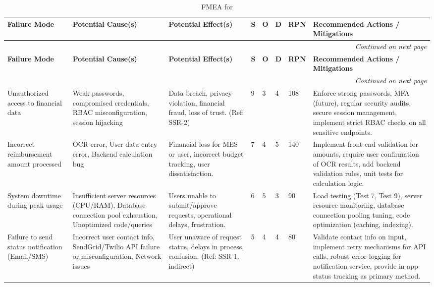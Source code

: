 \documentclass{article}
\begin{document}
\begin{longtable}{|p{2.2cm}|p{2.2cm}|p{3cm}|p{0.6cm}|p{0.6cm}|p{0.6cm}|p{0.6cm}|p{3.5cm}|}
\caption{FMEA for \progname{}} \label{tab:fmea} \\
\hline
\textbf{Failure Mode} & \textbf{Potential Cause(s)} & \textbf{Potential Effect(s)} & \textbf{S} & \textbf{O} & \textbf{D} & \textbf{RPN} & \textbf{Recommended Actions / Mitigations} \\
\hline
\endfirsthead

\multicolumn{8}{|r|}{\textit{Continued on next page}} \\
\hline
\textbf{Failure Mode} & \textbf{Potential Cause(s)} & \textbf{Potential Effect(s)} & \textbf{S} & \textbf{O} & \textbf{D} & \textbf{RPN} & \textbf{Recommended Actions / Mitigations} \\
\hline
\endhead

\multicolumn{8}{|r|}{\textit{Continued on next page}} \\
\hline
\endfoot

\hline
\endlastfoot

Unauthorized access to financial data & Weak passwords, compromised credentials, RBAC misconfiguration, session hijacking & Data breach, privacy violation, financial fraud, loss of trust. (Ref: SSR-2) & 9 & 3 & 4 & 108 & Enforce strong passwords, MFA (future), regular security audits, secure session management, implement strict RBAC checks on all sensitive endpoints. \\
\hline

Incorrect reimbursement amount processed & OCR error, User data entry error, Backend calculation bug & Financial loss for MES or user, incorrect budget tracking, user dissatisfaction. & 7 & 4 & 5 & 140 & Implement front-end validation for amounts, require user confirmation of OCR results, add backend validation rules, unit tests for calculation logic. \\
\hline

System downtime during peak usage & Insufficient server resources (CPU/RAM), Database connection pool exhaustion, Unoptimized code/queries & Users unable to submit/approve requests, operational delays, frustration. & 6 & 5 & 3 & 90 & Load testing (Test 7, Test 9), server resource monitoring, database connection pooling tuning, code optimization (caching, indexing). \\
\hline

Failure to send status notification (Email/SMS) & Incorrect user contact info, SendGrid/Twilio API failure or misconfiguration, Network issues & User unaware of request status, delays in process, confusion. (Ref: SSR-1, indirect) & 5 & 4 & 4 & 80 & Validate contact info on input, implement retry mechanisms for API calls, robust error logging for notification service, provide in-app status tracking as primary method. \\
\hline


\end{longtable}
\end{document}
